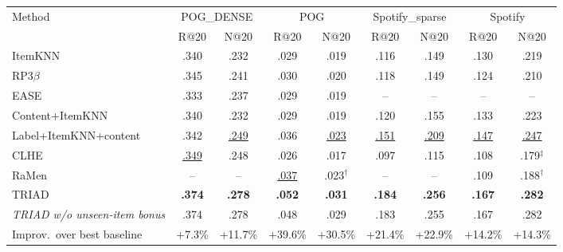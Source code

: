 \begin{tabular}{lcccccccc}
\toprule
Method & \multicolumn{2}{c}{POG\_DENSE} & \multicolumn{2}{c}{POG} & \multicolumn{2}{c}{Spotify\_sparse} & \multicolumn{2}{c}{Spotify}\\
\cmidrule(lr){2-3}\cmidrule(lr){4-5}\cmidrule(lr){6-7}\cmidrule(lr){8-9}
 & R@20 & N@20 & R@20 & N@20 & R@20 & N@20 & R@20 & N@20\\
\midrule
ItemKNN & .340 & .232 & .029 & .019 & .116 & .149 & .130 & .219\\
RP3$\beta$ & .345 & .241 & .030 & .020 & .118 & .149 & .124 & .210\\
EASE & .333 & .237 & .029 & .019 & -- & -- & -- & --\\
Content+ItemKNN & .340 & .232 & .029 & .019 & .120 & .155 & .133 & .223\\
Label+ItemKNN+content & .342 & \underline{.249} & .036 & \underline{.023} & \underline{.151} & \underline{.209} & \underline{.147} & \underline{.247}\\
\midrule
CLHE & \underline{.349} & .248 & .026 & .017 & .097 & .115 & .108 & .179$^\ddagger$\\
RaMen & -- & -- & \underline{.037} & .023$^\dagger$ & -- & -- & .109 & .188$^\dagger$\\
\midrule
TRIAD & \textbf{.374} & \textbf{.278} & \textbf{.052} & \textbf{.031} & \textbf{.184} & \textbf{.256} & \textbf{.167} & \textbf{.282}\\
\emph{TRIAD w/o unseen-item bonus} & .374 & .278 & .048 & .029 & .183 & .255 & .167 & .282\\
\midrule
Improv.\ over best baseline & +7.3\% & +11.7\% & +39.6\% & +30.5\% & +21.4\% & +22.9\% & +14.2\% & +14.3\%\\
\bottomrule
\end{tabular}
